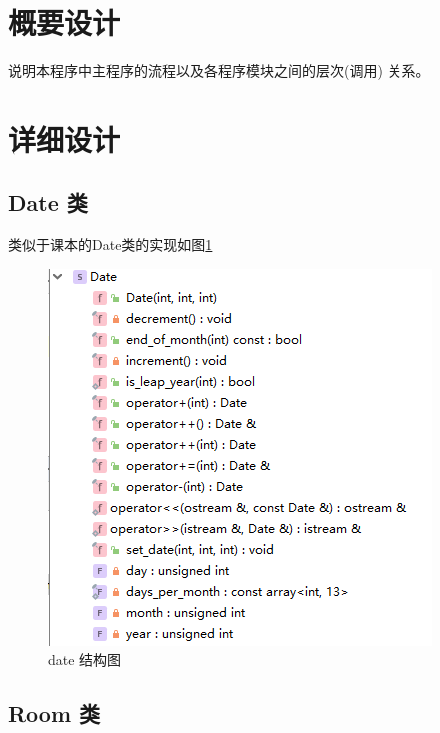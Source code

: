 \documentclass[UTF8]{ctexart}
\begin{document}
\section{概要设计}
  说明本程序中主程序的流程以及各程序模块之间的层次(调用) 关系。
\section{详细设计}

  \subsection{Date 类}

    类似于课本\cite{textbook}的Date类的实现如图\ref{fig:date}

      \begin{figure}[H]%
        \centering%
        \includegraphics[scale = 1]{structure_date.png}
        \caption{date 结构图}%
        \label{fig:date}
      \end{figure}

  \subsection{Room 类}
\end{document}
